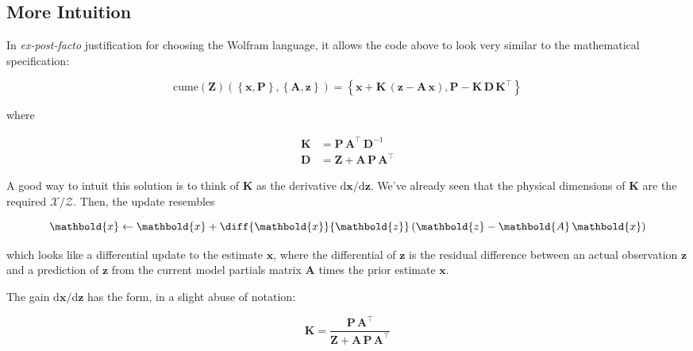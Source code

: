\documentclass[10pt,oneside,x11names]{article}
\begin{document}
\subsection{More Intuition}
\label{sec:orgheadline19}

In \emph{ex-post-facto} justification for choosing the Wolfram language,
it allows the code above to look very similar to the
mathematical specification:

\begin{equation}
\label{eqn:kalman-cume-definition}
\text{cume}
\left(
\mathbold{Z}
\right)
\left(
\left\{
\mathbold{x},
\mathbold{P}
\right\},
\left\{
\mathbold{A},
\mathbold{z}
\right\}
\right) =
\left\{
\mathbold{x}+
\mathbold{K}\,
\left(
\mathbold{z}-
\mathbold{A}\,
\mathbold{x}
\right),
\mathbold{P}-
\mathbold{K}\,
\mathbold{D}\,
\mathbold{K}^\intercal
\right\}
\end{equation}

\noindent where

\begin{align}
\label{eqn:kalman-gain-definition}
\mathbold{K}
&=
\mathbold{P}\,
\mathbold{A}^\intercal\,
\mathbold{D}^{-1} \\
\label{eqn:kalman-denominator-definition}
\mathbold{D}
&= \mathbold{Z} +
\mathbold{A}\,
\mathbold{P}\,
\mathbold{A}^\intercal
\end{align}

A good way to intuit this solution is to think of \(\mathbold{K}\) as the derivative
\(\text{d}\mathbold{x}/\text{d}\mathbold{z}\). We've already seen that the
physical dimensions of \(\mathbold{K}\) are the required
\(\mathcal{X}/\mathcal{Z}\). Then, the update resembles

\begin{equation*}
\mathbold{x}
\leftarrow
\mathbold{x} +
\diff{\mathbold{x}}{\mathbold{z}}
\left(
\mathbold{z}-
\mathbold{A}\,
\mathbold{x}
\right)
\end{equation*}

\noindent which looks like a differential update to the estimate
\(\mathbold{x}\), where the differential of \(\mathbold{z}\) is the residual
difference between an actual observation \(\mathbold{z}\) and a prediction of
\(\mathbold{z}\) from the current model partials matrix \(\mathbold{A}\) times the
prior estimate \(\mathbold{x}\).

The gain \(\text{d}\mathbold{x}/\text{d}\mathbold{z}\) has the form, in a slight
abuse of notation:

\begin{equation*}
\mathbold{K}=
\frac{
\mathbold{P}\,
\mathbold{A}^\intercal
}{
\mathbold{Z}+
\mathbold{A}\,
\mathbold{P}\,
\mathbold{A}^\intercal
}
\end{equation*}
\end{document}
